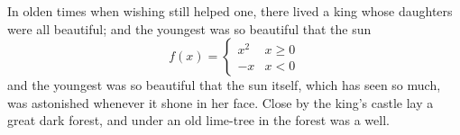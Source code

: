 In olden times when wishing still helped one, there lived a king whose daughters were all beautiful; and the youngest was so beautiful that the sun
\[ f(x) = \left\{ \begin{array}{ll} x^2 & x \ge 0 \\ -x & x < 0 \end{array} \right. \]
and the youngest was so beautiful that the sun itself, which has seen so much, was astonished whenever it shone in her face. Close by the king's castle lay a great dark forest, and under an old lime-tree in the forest was a well.
